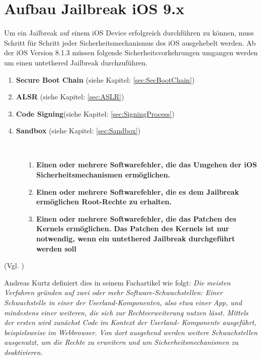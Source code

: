 \section{Aufbau Jailbreak iOS 9.x}
\label{sec:JBAufbau}
Um ein Jailbreak auf einem iOS Device erfolgreich durchführen zu können, muss Schritt für Schritt jeder Sicherheitsmechanismus des iOS ausgehebelt werden. Ab der iOS Version 8.1.3 müssen folgende Sicherheitsvorkehrungen umgangen werden um einen untethered Jailbreak durchzuführen.

\begin{enumerate}
	    \item \textbf{Secure Boot Chain} (siehe Kapitel: \ref{sec:SecBootChain})
	    \item \textbf{ALSR }(siehe Kapitel: \ref{sec:ASLR}) 
	    \item \textbf{Code Signing}(siehe Kapitel: \ref{sec:SigningProcess}) 	   
	    \item \textbf{Sandbox} (siehe Kapitel: \ref{sec:Sandbox}) 
\end{enumerate}

\begin{description}
    \item[\parbox{\textwidth} {Damit die Sicherheitsmechanismen überhaupt umgangen werden können, müssen verschiedene Programmierfehler im iOS gefunden werden. }]~\par
  \begin{enumerate}
  \item \textbf{Einen oder mehrere Softwarefehler, die das Umgehen der iOS Sicherheitsmechanismen ermöglichen.}
  \item \textbf{Einen oder mehrere Softwarefehler, die es dem Jailbreak ermöglichen Root-Rechte zu erhalten.}
  \item \textbf{Einen oder mehrere Softwarefehler, die das Patchen des Kernels ermöglichen. Das Patchen des Kernels ist nur notwendig, wenn ein untethered Jailbreak durchgeführt werden soll}
\end{enumerate}\end{description} 
(Vgl. \cite{TaiG[1], TaiG[2], TaiG[3]})

Andreas Kurtz definiert dies in seinem Fachartikel wie folgt: \textit{\glqq Die meisten Verfahren gründen auf zwei oder mehr Software-Schwachstellen: Einer Schwachstelle in einer der Userland-Komponenten, also etwa einer App, und mindestens einer weiteren, die sich zur Rechteerweiterung nutzen lässt. Mittels der ersten wird zunächst Code im Kontext der Userland- Komponente ausgeführt, beispielsweise im Webbrowser. Von dort ausgehend werden weitere Schwachstellen ausgenutzt, um die Rechte zu erweitern und um Sicherheitsmechanismen zu deaktivieren.\grqq{}} \cite{JB[2]}

